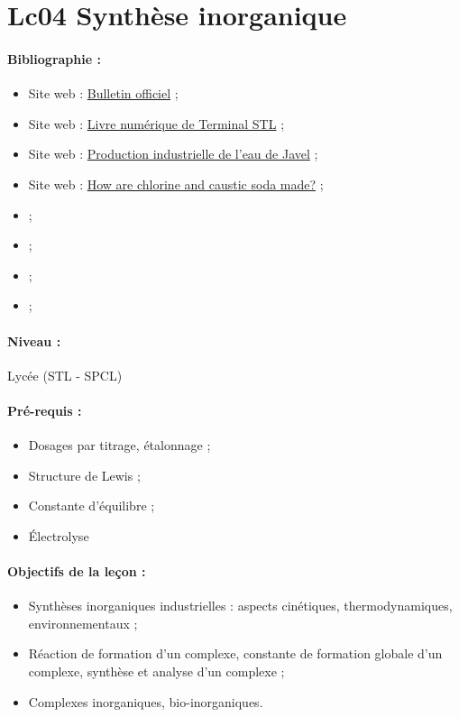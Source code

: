 \section{Lc04 Synthèse inorganique}

\paragraph{Bibliographie :}
\begin{itemize}
\item Site web : \href{https://www.education.gouv.fr/pid25535/bulletin_officiel.html?cid_bo=57629}{Bulletin officiel} ;
\item Site web : \href{http://sciences-physiques-et-chimiques-de-laboratoire.org/course/view.php?id=7&section=16}{Livre numérique de Terminal STL} ;
\item Site web : \href{https://www.lelementarium.fr/product/eau-de-javel/}{Production industrielle de l'eau de Javel} ;
\item Site web : \href{https://www.eurochlor.org/about-chlor-alkali/how-are-chlorine-and-caustic-soda-made/}{How are chlorine and caustic soda made?} ;
\item \cite{Buchere2017} ;
\item \cite{Cachau-Hereillat2011} ;
\item \cite{Fosset2016} ;
\item \cite{Fosset2014} ;
\end{itemize}

\paragraph{Niveau :} Lycée (STL - SPCL)

\paragraph{Pré-requis :}
\begin{itemize}
\item Dosages par titrage, étalonnage ;
\item Structure de Lewis ;
\item Constante d'équilibre ;
\item Électrolyse
\end{itemize}

\paragraph{Objectifs de la leçon :}
\begin{itemize}
\item Synthèses inorganiques industrielles : aspects cinétiques, thermodynamiques, environnementaux ;
\item Réaction de formation d'un complexe, constante de formation globale d'un complexe, synthèse et analyse d'un complexe ;
\item Complexes inorganiques, bio-inorganiques.
\end{itemize}

